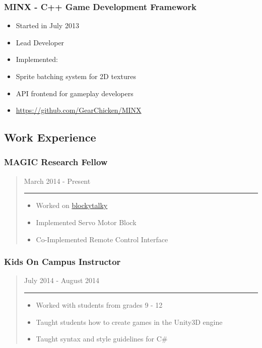 \documentclass[line,margin]{res}
\begin{document}
\subsubsection{MINX - C++ Game Development
Framework}
\begin{itemize}
\itemsep1pt\parskip0pt
\item
  Started in July 2013
\item
  Lead Developer
\item
  Implemented:
\item
  Sprite batching system for 2D textures
\item
  API frontend for gameplay developers
\item
  \url{https://github.com/GearChicken/MINX}
\end{itemize}
\subsection{Work Experience}
\subsubsection{MAGIC Research Fellow}
\begin{quote}
March 2014 - Present
\begin{center}\rule{3in}{0.4pt}\end{center}
\begin{itemize}
\itemsep1pt\parskip0pt
\item
  Worked on
  \href{https://github.com/liam-middlebrook/blockytalky.git}{blockytalky}
\item
  Implemented Servo Motor Block
\item
  Co-Implemented Remote Control Interface
\end{itemize}
\end{quote}
\subsubsection{Kids On Campus
Instructor}
\begin{quote}
July 2014 - August 2014
\begin{center}\rule{3in}{0.4pt}\end{center}
\begin{itemize}
\itemsep1pt\parskip0pt
\item
  Worked with students from grades 9 - 12
\item
  Taught students how to create games in the Unity3D engine
\item
  Taught syntax and style guidelines for C\#
\end{itemize}
\end{quote}
\end{document}

